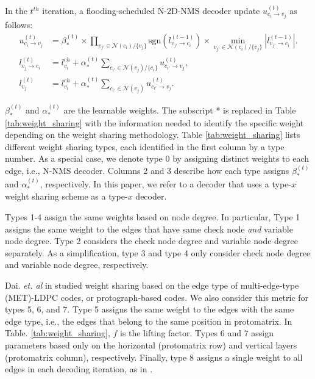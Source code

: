 \documentclass [PhD] {uclathes}
\begin{document}
In the $t^{th}$ iteration, a flooding-scheduled N-2D-NMS decoder update $u^{(t)}_{c_i\rightarrow v_j}$ as follows:
\begingroup
\allowbreak
\begin{align}
     u^{(t)}_{c_i\rightarrow v_j} &= \beta^{(t)}_{*} \times  \prod_{v_{j'}\in \mathcal{N}(c_i)/\{v_j\}} \text{sgn}\left(l^{(t-1)}_{v_{j'}\rightarrow c_{i}}\right)  \times  \min_{v_{j'}\in \mathcal{N}(c_i)/\{v_j\}} \left|l^{(t-1)}_{v_{j'}\rightarrow c_{i}}\right|.\\
      l^{(t)}_{v_j\rightarrow c_i} &=  l^{ch}_{v_i} + \alpha^{(t)}_{*}  \sum_{c_{i'}\in \mathcal{N}(v_j)/\{c_i\}} u^{(t)}_{c_{i'}\rightarrow v_j},\\
    l^{(t)}_{v_j} &=  l^{ch}_{v_i} + \alpha^{(t)}_{*}  \sum_{c_{i'}\in \mathcal{N}(v_j)} u^{(t)}_{c_{i'}\rightarrow v_j}.
\end{align}
\endgroup



$\beta^{(t)}_{*}$ and $\alpha^{(t)}_{*}$ are the learnable weights. The subscript * is replaced in Table \ref{tab:weight_sharing} with the information needed to identify the specific weight depending on the weight sharing methodology. 
Table \ref{tab:weight_sharing} lists different weight sharing types, each identified in the first column by a type number. As a special case, we denote type 0 by assigning distinct weights to each edge, i.e., N-NMS decoder. Columns 2 and 3 describe how each type assigns $\beta^{(t)}_{*}$ and $\alpha^{(t)}_{*}$, respectively. In this paper, we refer to a decoder that uses a type-$x$ weight sharing scheme as a type-$x$ decoder. 

Types 1-4 assign the same weights based on node degree. In particular, Type 1 assigns the same weight to the edges that have same check node \emph{and} variable node degree. Type 2 considers the check node degree and variable node degree separately. As a simplification, type 3 and type 4 only consider check node degree and variable node degree, respectively.

Dai. \emph{et. al} in \cite{dai2021learning} studied weight sharing based on the edge type of multi-edge-type (MET)-LDPC codes, or protograph-based codes. We also consider this metric for types 5, 6, and 7. Type 5  assigns the same weight to the edges with the same edge type, i.e., the edges that belong to the same position in protomatrix. In Table. \ref{tab:weight_sharing}, $f$ is the lifting factor.  Types 6 and 7 assign parameters based only on the horizontal (protomatrix row) and vertical layers (protomatrix column), respectively.
Finally, type 8 assigns a single weight to all edges in each decoding iteration, as in \cite{Lian2019-jh,Abotabl2019-wt}. 
\end{document}
